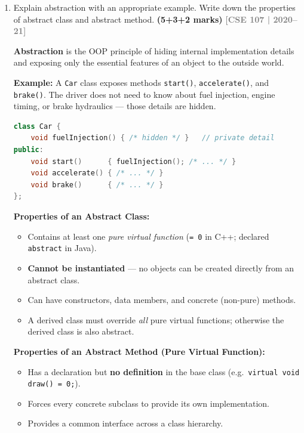 \documentclass[12pt,a3paper]{article}
\newcommand{\yr}[1]{\hfill\textcolor{gray}{\small\textbf{[#1]}}}
\newcommand{\mk}[1]{\textcolor{orange!70!black}{\small\textbf{(#1 marks)}}}
\begin{document}
\begin{enumerate}
\begin{tcolorbox}[enhanced,breakable,ansbox,colback=cA!4,colframe=cA,
  boxrule=0.8pt,arc=5pt,
  title={\textbf{Answer}},fonttitle=\bfseries\color{white},colbacktitle=cA]
\end{tcolorbox}

\item Explain abstraction with an appropriate example. Write down the properties of abstract class and abstract method. \mk{5+3+2}
\yr{CSE 107 | 2020--21}

\begin{tcolorbox}[enhanced,breakable,ansbox,colback=cA!4,colframe=cA,
  boxrule=0.8pt,arc=5pt,
  title={\textbf{Answer}},fonttitle=\bfseries\color{white},colbacktitle=cA]

\textbf{Abstraction} is the OOP principle of hiding internal
implementation details and exposing only the essential features of an
object to the outside world.

\textbf{Example:} A \texttt{Car} class exposes methods
\texttt{start()}, \texttt{accelerate()}, and \texttt{brake()}.  The
driver does not need to know about fuel injection, engine timing, or
brake hydraulics --- those details are hidden.

\begin{lstlisting}[language=C++]
class Car {
    void fuelInjection() { /* hidden */ }   // private detail
public:
    void start()      { fuelInjection(); /* ... */ }
    void accelerate() { /* ... */ }
    void brake()      { /* ... */ }
};
\end{lstlisting}

\medskip
\textbf{Properties of an Abstract Class:}
\begin{itemize}[itemsep=2pt]
  \item Contains at least one \emph{pure virtual function}
    (\texttt{= 0} in C++; declared \texttt{abstract} in Java).
  \item \textbf{Cannot be instantiated} --- no objects can be created
    directly from an abstract class.
  \item Can have constructors, data members, and concrete (non-pure)
    methods.
  \item A derived class must override \emph{all} pure virtual
    functions; otherwise the derived class is also abstract.
\end{itemize}

\textbf{Properties of an Abstract Method (Pure Virtual Function):}
\begin{itemize}[itemsep=2pt]
  \item Has a declaration but \textbf{no definition} in the base
    class (e.g.\ \texttt{virtual void draw() = 0;}).
  \item Forces every concrete subclass to provide its own
    implementation.
  \item Provides a common interface across a class hierarchy.
\end{itemize}


\end{tcolorbox}
\end{enumerate}
\end{document}
